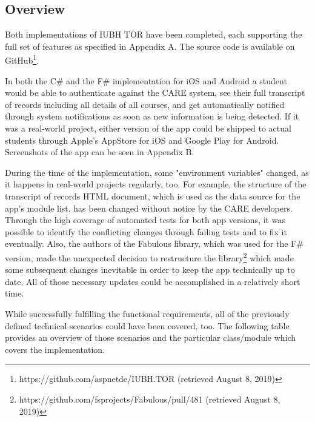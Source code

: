 \subsection{Overview}

Both implementations of IUBH TOR have been completed, each supporting the full set of features as specified in Appendix A. The source code is available on GitHub\footnote{https://github.com/aspnetde/IUBH.TOR (retrieved August 8, 2019)}.

In both the C\# and the F\# implementation for iOS and Android a student would be able to authenticate against the CARE system, see their full transcript of records including all details of all courses, and get automatically notified through system notifications as soon as new information is being detected. If it was a real-world project, either version of the app could be shipped to actual students through Apple's AppStore for iOS and Google Play for Android. Screenshots of the app can be seen in Appendix B.

During the time of the implementation, some "environment variables" changed, as it happens in real-world projects regularly, too. For example, the structure of the transcript of records HTML document, which is used as the data source for the app's module list, has been changed without notice by the CARE developers. Through the high coverage of automated tests for both app versions, it was possible to identify the conflicting changes through failing tests and to fix it eventually. Also, the authors of the Fabulous library, which was used for the F\# version, made the unexpected decision to restructure the library\footnote{https://github.com/fsprojects/Fabulous/pull/481 (retrieved August 8, 2019)} which made some subsequent changes inevitable in order to keep the app technically up to date. All of those necessary updates could be accomplished in a relatively short time.

While successfully fulfilling the functional requirements, all of the previously defined technical scenarios could have been covered, too. The following table provides an overview of those scenarios and the particular class/module which covers the implementation.

